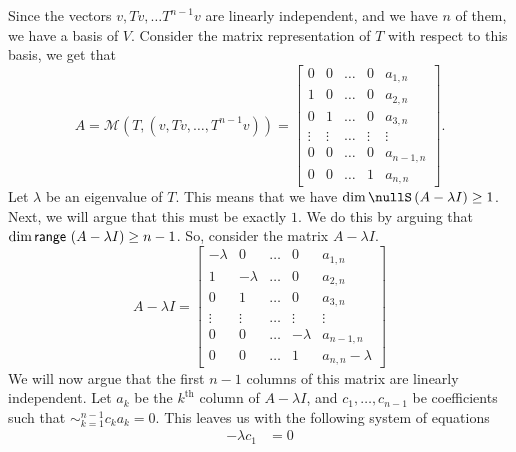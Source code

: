\documentclass[answers]{exam}
\begin{document}
\begin{questions}
\begin{parts}
\begin{solution}
            Since the vectors $v,Tv,\dots T^{n-1}v$ are linearly independent, and we have $n$ of them, we have
            a basis of $V$. Consider the matrix representation of $T$ with respect to this basis, we get that
            \[
                A = \mathcal{M}\left(T,(v,Tv,\dots,T^{n-1}v)\right) = 
                \begin{bmatrix}
                    0      & 0      & \dots & 0      & a_{1,n} \\
                    1      & 0      & \dots & 0      & a_{2,n} \\
                    0      & 1      & \dots & 0      & a_{3,n} \\
                    \vdots & \vdots & \dots & \vdots & \vdots \\
                    0      & 0      & \dots & 0      & a_{n-1,n}\\
                    0      & 0      & \dots & 1      & a_{n,n}
                \end{bmatrix}.
            \]
            Let $\lambda$ be an eigenvalue of $T$. This means that we have
            $\dim\nullS\left(A-\lambda I\right) \geq 1$. Next, we will argue that this must be exactly $1$.
            We do this by arguing that $\text{dim}\,\mathsf{range}\,\left(A-\lambda I\right)\geq n-1$. So, consider the matrix
            $A - \lambda I$.
            \[
                A-\lambda I = \begin{bmatrix}
                    -\lambda & 0       & \dots & 0       & a_{1,n}  \\
                    1        & -\lambda& \dots & 0       & a_{2,n}  \\
                    0        & 1       & \dots & 0       & a_{3,n}  \\
                    \vdots   & \vdots  & \dots & \vdots  & \vdots   \\
                    0        & 0       & \dots & -\lambda& a_{n-1,n}\\
                    0        & 0       & \dots & 1       & a_{n,n}-\lambda
                \end{bmatrix}
            \]
            We will now argue that the first $n-1$ columns of this matrix are linearly independent.
            Let $a_k$ be the $k^\text{th}$ column of $A-\lambda I$, and $c_1,\dots,c_{n-1}$ be coefficients
            such that $\sim_{k=1}^{n-1}c_ka_k = 0$. This leaves us with the following system of equations
            \begin{align*}
                -\lambda c_1 &= 0 \\

\end{align*}
\end{solution}
\end{parts}
\end{questions}
\end{document}
